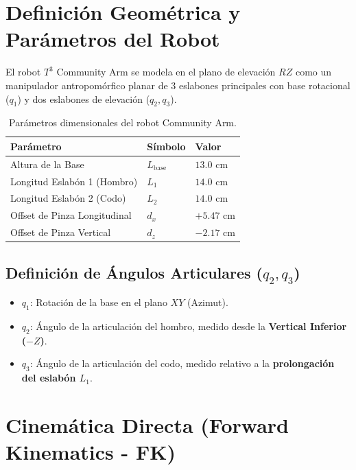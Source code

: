 \documentclass[12pt,letterpaper]{article}
\begin{document}
\section{Definición Geométrica y Parámetros del Robot}

El robot $T^3$ Community Arm se modela en el plano de elevación $RZ$ como un manipulador antropomórfico planar de 3 eslabones principales con base rotacional ($q_1$) y dos eslabones de elevación ($q_2, q_3$).

\begin{table}[h!]
\centering
\begin{tabular}{@{}lll@{}}
\toprule
\textbf{Parámetro} & \textbf{Símbolo} & \textbf{Valor} \\ \midrule
Altura de la Base & $L_{\text{base}}$ & $13.0\text{ cm}$ \\
Longitud Eslabón 1 (Hombro) & $L_1$ & $14.0\text{ cm}$ \\
Longitud Eslabón 2 (Codo) & $L_2$ & $14.0\text{ cm}$ \\
Offset de Pinza Longitudinal & $d_x$ & $+5.47\text{ cm}$ \\
Offset de Pinza Vertical & $d_z$ & $-2.17\text{ cm}$ \\ \bottomrule
\end{tabular}
\caption{Parámetros dimensionales del robot Community Arm.}
\end{table}

\subsection{\texorpdfstring{Definición de Ángulos Articulares ($q_2, q_3$)}{Definicion de Angulos Articulares (q2, q3)}}

\begin{itemize}
    \item $q_1$: Rotación de la base en el plano $XY$ (Azimut).
    \item $q_2$: Ángulo de la articulación del hombro, medido desde la \textbf{Vertical Inferior ($-Z$)}.
    \item $q_3$: Ángulo de la articulación del codo, medido relativo a la \textbf{prolongación del eslabón $L_1$}.
\end{itemize}

\section{Cinemática Directa (Forward Kinematics - FK)}
\end{document}
